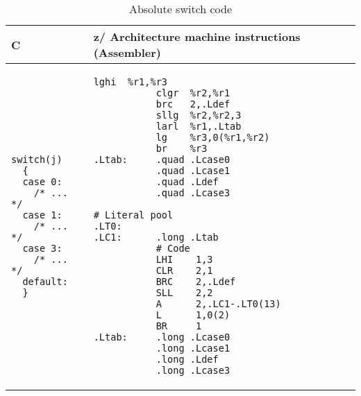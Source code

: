 \documentclass[english,11pt,twoside,toc=bib,toc=idx]{scrreprt}
\newcommand{\ARCH}{z/\kern-1pt Ar\-chi\-tec\-ture}
\newcommand{\ARCH}{ESA/390}
\newenvironment{DIFnomarkup}{}{} %
\begin{document}
\begin{table}
  \centering
  \begin{DIFnomarkup}
  \begin{tabular}{p{}p{}}
    \toprule
    C & \ARCH{} machine instructions (Assembler) \\
    \midrule
\begin{lstlisting}[style=short]
switch(j)
  {
  case 0:
    /* ... */
  case 1:
    /* ... */
  case 3:
    /* ... */
  default:
  }
\end{lstlisting}
    &
\ifzseries
\begin{lstlisting}[style=short,language=simpleasm]
           lghi  %r1,%r3
           clgr  %r2,%r1
           brc   2,.Ldef
           sllg  %r2,%r2,3
           larl  %r1,.Ltab
           lg    %r3,0(%r1,%r2)
           br    %r3
.Ltab:     .quad .Lcase0
           .quad .Lcase1
           .quad .Ldef
           .quad .Lcase3
\end{lstlisting}
\else
\begin{lstlisting}[style=short,language=simpleasm]
           # Literal pool
.LT0:
.LC1:      .long .Ltab
           # Code
           LHI    1,3
           CLR    2,1
           BRC    2,.Ldef
           SLL    2,2
           A      2,.LC1-.LT0(13)
           L      1,0(2)
           BR     1
.Ltab:     .long .Lcase0
           .long .Lcase1
           .long .Ldef
           .long .Lcase3
\end{lstlisting}
\fi \\
    \bottomrule
  \end{tabular}
  \end{DIFnomarkup}
  \caption{Absolute switch code}
  \label{tab:absswitch}
\end{table}
\end{document}

